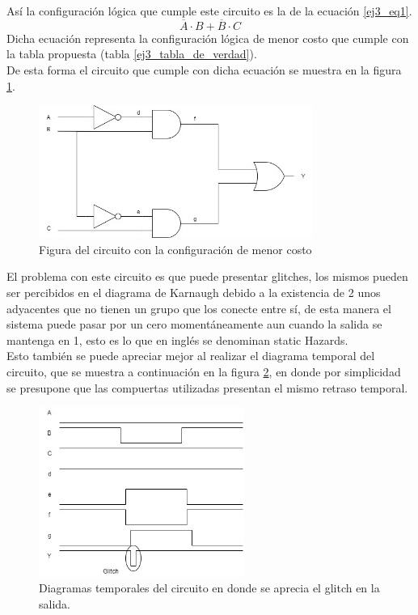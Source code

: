 %
%
%
\noindent
Así la configuraci\'on l\'ogica que cumple este circuito es la de la ecuaci\'on \ref{ej3_eq1}.
%
\begin{equation}
    \overline{A} \cdot B+\overline{B} \cdot C
    \label{ej3_eq1}
\end{equation}
%
\noindent
Dicha ecuación representa la configuración lógica de menor costo que cumple con la tabla propuesta (tabla \ref{ej3_tabla_de_verdad}).\\
\noindent
De esta forma el circuito que cumple con dicha ecuación se muestra en la figura \ref{ej3_circuito}.
%
\begin{figure}[H]
    \centering
        \centering
        \includegraphics[width=0.8\textwidth]{figs/Ej3/circuito1.jpg} %
         \caption{Figura del circuito con la configuraci\'on de menor costo}
         \label{ej3_circuito}
\end{figure}
%
\noindent
El problema con este circuito es que puede presentar glitches, los mismos pueden ser percibidos en el diagrama de Karnaugh debido a la existencia de 2 unos adyacentes que no tienen un grupo que los conecte entre sí, de esta manera el sistema puede pasar por un cero momentáneamente aun cuando la salida se mantenga en 1, esto es lo que en inglés se denominan static Hazards.\\
\noindent
Esto también se puede apreciar mejor al realizar el diagrama temporal del circuito, que se muestra a continuación en la figura \ref{ej3_glitch}, en donde por simplicidad se presupone que las compuertas utilizadas presentan el mismo retraso temporal.
%
\begin{figure}[H]
    \centering
        \centering
        \includegraphics[width=0.6\textwidth]{figs/Ej3/glitch.jpg} %
         \caption{Diagramas temporales del circuito en donde se aprecia el glitch en la salida.}
         \label{ej3_glitch}
\end{figure}
